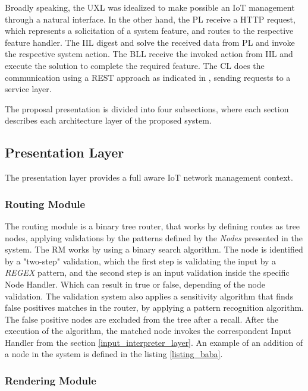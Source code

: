 \documentclass[3p,times]{elsarticle}
\begin{document}
Broadly speaking, the UXL was idealized to make possible an IoT management through a natural interface. 
In the other hand, the PL receive a HTTP request, which represents a solicitation of a system
feature, and routes to the respective feature handler. The IIL digest and solve the received data
from PL and invoke the respective system action. The BLL receive the invoked action from IIL and execute the solution
to complete the required feature. The CL does the communication using a REST approach as indicated in \cite{silva2016restiot}, 
sending requests to a service layer.

The proposal presentation is divided into four subsections, where each section describes each architecture layer of
the proposed system. 

\subsection{Presentation Layer}
\label{presentation_layer}

The presentation layer provides a full aware IoT network management context.

\subsubsection{Routing Module}
\label{routing_module}

The routing module is a binary tree router, that works by defining routes as tree nodes, applying validations by the patterns defined by the \textit{Nodes} presented in the system.
The RM works by using a binary search algorithm. The node is identified by a "two-step" validation, which the first step is validating the input by a \textit{REGEX} pattern, and the second step is an input validation inside the specific Node Handler. Which can result in true or false, depending of the node validation. The validation system also applies a sensitivity algorithm that finds false positives matches in the router, by applying a pattern recognition algorithm. The false positive nodes are excluded from the tree after a recall.
After the execution of the algorithm, the matched node invokes the correspondent Input Handler from the section \ref{input_interpreter_layer}.
An example of an addition of a node in the system is defined in the listing \ref{listing_baba}.

\subsubsection{Rendering Module}
\label{rendering_module}
\end{document}

